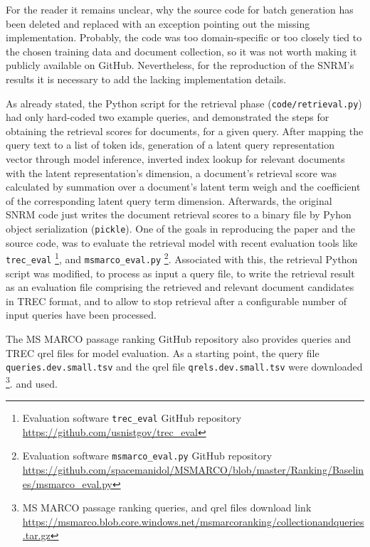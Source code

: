 For the reader it remains unclear, why the source code for batch generation has been deleted and replaced with an exception pointing out the
    missing implementation. 
Probably, the code was too domain-specific or too closely tied to the chosen training data and document collection,
    so it was not worth making it publicly available on GitHub.
Nevertheless, for the reproduction of the SNRM's results it is necessary to add the lacking implementation details.

As already stated, the Python script for the retrieval phase (\texttt{code/retrieval.py}) had only hard-coded two example queries,
    and demonstrated the steps for obtaining the retrieval scores for documents, for a given query.
After mapping the query text to a list of token ids, generation of a latent query representation vector through model inference, 
    inverted index lookup for relevant documents with the latent representation's dimension, a document's retrieval score was
    calculated by summation over a document's latent term weigh and the coefficient of the corresponding latent query term dimension.
Afterwards, the original SNRM code just writes the document retrieval scores to a binary file by Pyhon object serialization (\texttt{pickle}).
One of the goals in reproducing the paper and the source code, was to evaluate the retrieval model with recent evaluation tools like 
    \verb|trec_eval| \footnote{Evaluation software \texttt{trec\_eval} GitHub repository \url{https://github.com/usnistgov/trec_eval}},
    and \verb|msmarco_eval.py| 
    \footnote{Evaluation software \texttt{msmarco\_eval.py} GitHub repository \url{https://github.com/spacemanidol/MSMARCO/blob/master/Ranking/Baselines/msmarco_eval.py}}.
Associated with this, the retrieval Python script was modified, to process as input a query file, to write the retrieval result as an 
    evaluation file comprising the retrieved and relevant document candidates in TREC format, 
    and to allow to stop retrieval after a configurable number of input queries have been processed. 

The MS MARCO passage ranking GitHub repository also provides queries and TREC qrel files for model evaluation.
As a starting point, the query file \texttt{queries.dev.small.tsv} and the qrel file \texttt{qrels.dev.small.tsv} were downloaded
    \footnote{MS MARCO passage ranking queries, and qrel files download link \url{https://msmarco.blob.core.windows.net/msmarcoranking/collectionandqueries.tar.gz} }.
    and used.


